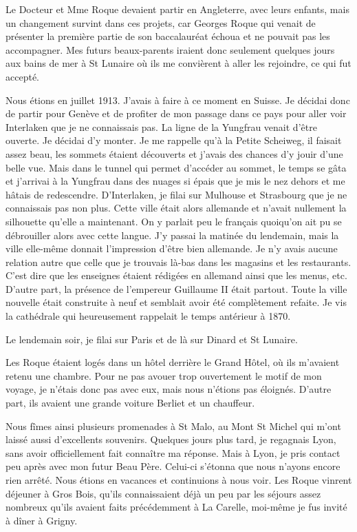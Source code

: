 \documentclass[11pt,a4paper]{report}
\begin{document}
Le Docteur et Mme Roque devaient partir en Angleterre, avec leurs enfants, mais un changement survint dans ces projets, car Georges Roque qui venait de présenter la première partie de son baccalauréat échoua et ne pouvait pas les accompagner. Mes futurs beaux-parents iraient donc seulement quelques jours aux bains de mer à St Lunaire où ils me convièrent à aller les rejoindre, ce qui fut accepté.

Nous étions en juillet 1913. J'avais à faire à ce moment en Suisse. Je décidai donc de partir pour Genève et de profiter de mon passage dans ce pays pour aller voir Interlaken que je ne connaissais pas. La ligne de la Yungfrau venait d'être ouverte. Je décidai d'y monter. Je me rappelle qu'à la Petite Scheiweg, il faisait assez beau, les sommets étaient découverts et j'avais des chances d'y jouir d'une belle vue. Mais dans le tunnel qui permet d'accéder au sommet, le temps se gâta et j'arrivai à la Yungfrau dans des nuages si épais que je mis le nez dehors et me hâtais de redescendre. D'Interlaken, je filai sur Mulhouse et Strasbourg que je ne connaissais pas non plus. Cette ville était alors allemande et n'avait nullement la silhouette qu'elle a maintenant. On y parlait peu le français quoiqu'on ait pu se débrouiller alors avec cette langue. J'y passai la matinée du lendemain, mais la ville elle-même donnait l'impression d'être bien allemande. Je n'y avais aucune relation autre que celle que je trouvais là-bas dans les magasins et les restaurants. C'est dire que les enseignes étaient rédigées en allemand ainsi que les menus, etc. D'autre part, la présence de l'empereur Guillaume II était partout. Toute la ville nouvelle était construite à neuf et semblait avoir été complètement refaite. Je vis la cathédrale qui heureusement rappelait le temps antérieur à 1870.

Le lendemain soir, je filai sur Paris et de là sur Dinard et St Lunaire.

Les Roque étaient logés dans un hôtel derrière le Grand Hôtel, où ils m'avaient retenu une chambre. Pour ne pas avouer trop ouvertement le motif de mon voyage, je n'étais donc pas avec eux, mais nous n'étions pas éloignés. D'autre part, ils avaient une grande voiture Berliet et un chauffeur.

Nous fîmes ainsi plusieurs promenades à St Malo, au Mont St Michel qui m'ont laissé aussi d'excellents souvenirs. Quelques jours plus tard, je regagnais Lyon, sans avoir officiellement fait connaître ma réponse. Mais à Lyon, je pris contact peu après avec mon futur Beau Père. Celui-ci s'étonna que nous n'ayons encore rien arrêté. Nous étions en vacances et continuions à nous voir. Les Roque vinrent déjeuner à Gros Bois, qu'ils connaissaient déjà un peu par les séjours assez nombreux qu'ils avaient faits précédemment à La Carelle, moi-même je fus invité à dîner à Grigny.
\end{document}
